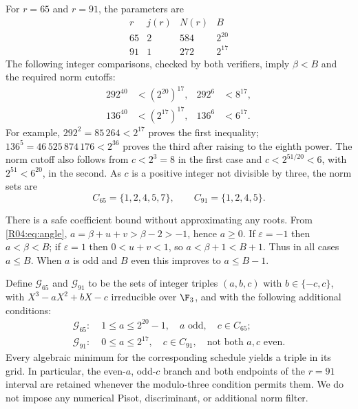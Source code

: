 \documentclass[11pt,a4paper]{article}
\theoremstyle{definition}\newtheorem{definition}[theorem]{Definition}
\theoremstyle{remark}\newtheorem{remark}[theorem]{Remark}
\begin{document}
For $r=65$ and $r=91$, the parameters are
\[
 \begin{array}{c|c|c|c}
 r&j(r)&N(r)&B\\\hline
 65&2&584&2^{20}\\
 91&1&272&2^{17}
 \end{array}
\]
The following integer comparisons, checked by both verifiers, imply
$\beta<B$ and the required norm cutoffs:
\begin{equation}\label{R04:eq:integerbounds}
 \begin{aligned}
 292^{40}&<(2^{20})^{17},&292^6&<8^{17},\\
 136^{40}&<(2^{17})^{17},&136^6&<6^{17}.
 \end{aligned}
\end{equation}
For example, $292^2=85\,264<2^{17}$ proves the first inequality;
$136^5=46\,525\,874\,176<2^{36}$ proves the third after raising to
the eighth power. The norm cutoff also follows from
$c<2^3=8$ in the first case and
$c<2^{51/20}<6$, with $2^{51}<6^{20}$, in the second.
As $c$ is a positive integer not divisible by three, the norm sets are
\[
 C_{65}=\{1,2,4,5,7\},\qquad C_{91}=\{1,2,4,5\}.
\]

There is a safe coefficient bound without approximating any roots.
From \eqref{R04:eq:angle}, $a=\beta+u+v>\beta-2>-1$, hence $a\ge0$.
If $\varepsilon=-1$ then $a<\beta<B$; if $\varepsilon=1$ then
$0<u+v<1$, so $a<\beta+1<B+1$. Thus in all cases $a\le B$.
When $a$ is odd and $B$ even this improves to $a\le B-1$.

Define $\mathcal G_{65}$ and $\mathcal G_{91}$ to be the sets of
integer triples $(a,b,c)$ with $b\in\{-c,c\}$, with
$X^3-aX^2+bX-c$ irreducible over $\F_3$, and with the following
additional conditions:
\begin{equation}\label{R04:eq:grids}
 \begin{aligned}
 \mathcal G_{65}:\;&1\le a\le2^{20}-1,\quad a\text{ odd},
       \quad c\in C_{65};\\
 \mathcal G_{91}:\;&0\le a\le2^{17},\quad c\in C_{91},
       \quad\text{not both }a,c\text{ even}.
 \end{aligned}
\end{equation}
Every algebraic minimum for the corresponding schedule yields a
triple in its grid. In particular, the even-$a$, odd-$c$ branch and
both endpoints of the $r=91$ interval are retained whenever the
modulo-three condition permits them. We do not impose any numerical
Pisot, discriminant, or additional norm filter.
\end{document}
